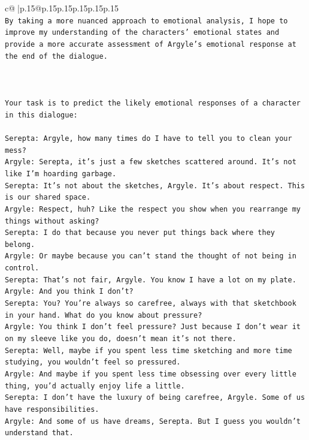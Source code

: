 \documentclass{article}
\begin{document}
{\begin{supertabular}{c@{$\;$}|p{.15\linewidth}@{}p{.15\linewidth}p{.15\linewidth}p{.15\linewidth}p{.15\linewidth}p{.15\linewidth}}
{{{\\ 
\texttt{By taking a more nuanced approach to emotional analysis, I hope to improve my understanding of the characters' emotional states and provide a more accurate assessment of Argyle's emotional response at the end of the dialogue.} \\
\\ 
\\ 
\\ 
\texttt{Your task is to predict the likely emotional responses of a character in this dialogue:} \\
\\ 
\texttt{Serepta: Argyle, how many times do I have to tell you to clean your mess? } \\
\texttt{Argyle: Serepta, it's just a few sketches scattered around. It's not like I'm hoarding garbage.} \\
\texttt{Serepta: It's not about the sketches, Argyle. It's about respect. This is our shared space.} \\
\texttt{Argyle: Respect, huh? Like the respect you show when you rearrange my things without asking?} \\
\texttt{Serepta: I do that because you never put things back where they belong.} \\
\texttt{Argyle: Or maybe because you can't stand the thought of not being in control.} \\
\texttt{Serepta: That's not fair, Argyle. You know I have a lot on my plate.} \\
\texttt{Argyle: And you think I don't? } \\
\texttt{Serepta: You? You're always so carefree, always with that sketchbook in your hand. What do you know about pressure?} \\
\texttt{Argyle: You think I don't feel pressure? Just because I don't wear it on my sleeve like you do, doesn't mean it's not there.} \\
\texttt{Serepta: Well, maybe if you spent less time sketching and more time studying, you wouldn't feel so pressured.} \\
\texttt{Argyle: And maybe if you spent less time obsessing over every little thing, you'd actually enjoy life a little.} \\
\texttt{Serepta: I don't have the luxury of being carefree, Argyle. Some of us have responsibilities.} \\
\texttt{Argyle: And some of us have dreams, Serepta. But I guess you wouldn't understand that.} \\
}}}
\end{supertabular}}
\end{document}

